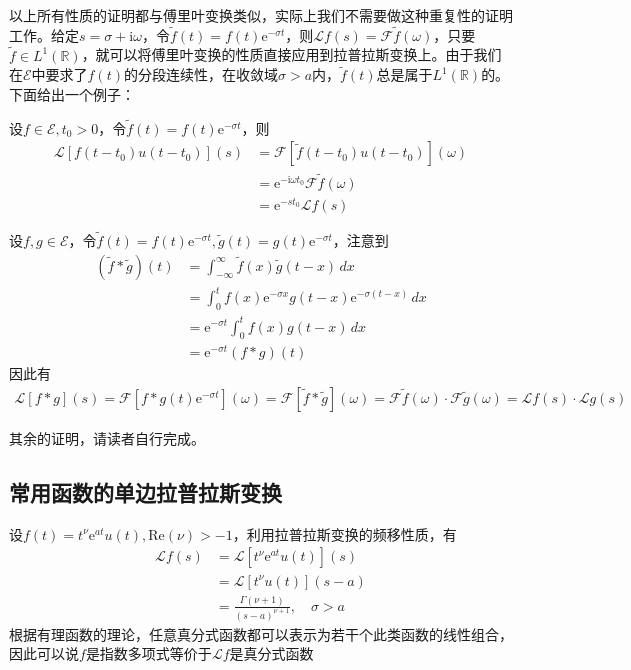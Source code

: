 以上所有性质的证明都与傅里叶变换类似，实际上我们不需要做这种重复性的证明工作。给定$s=\sigma+\mathrm{i}\omega$，令$\tilde{f}(t)=f(t)\mathrm{e}^{-\sigma t}$，则$\mathcal{L} f(s)=\mathcal{F} \tilde{f}(\omega)$，只要$\tilde{f}\in L^1(\mathbb{R} )$，就可以将傅里叶变换的性质直接应用到拉普拉斯变换上。由于我们在$\mathcal{E} $中要求了$f(t)$的分段连续性，在收敛域$\sigma>a$内，$\tilde{f}(t)$总是属于$L^1(\mathbb{R})$的。下面给出一个例子：
\begin{example}[时移性质]
    设$f\in\mathcal{E} ,t_0>0$，令$\tilde{f}(t)=f(t)\mathrm{e}^{-\sigma t}$，则
    \begin{align*}
        \mathcal{L}[f(t-t_0)u(t-t_0)](s)&=\mathcal{F} \left[\tilde{f}(t-t_0)u(t-t_0)\right](\omega)\\
        &=\mathrm{e}^{-\mathrm{i}\omega t_0}\mathcal{F} \tilde{f}(\omega)\\
        &=\mathrm{e}^{-s t_0}\mathcal{L} f(s)
    \end{align*}
\end{example}
\begin{example}[卷积定理]
设$f,g\in\mathcal{E} $，令$\tilde{f}(t)=f(t)\mathrm{e}^{-\sigma t}, \tilde{g}(t)=g(t)\mathrm{e}^{-\sigma t}$，注意到\begin{align*}
    (\tilde{f}*\tilde{g})(t)&=\int_{-\infty}^{\infty}\tilde{f}(x)\tilde{g}(t-x)\,dx\\
    &=\int_0^{t}f(x)\mathrm{e}^{-\sigma x}g(t-x)\mathrm{e}^{-\sigma (t-x)}\,dx\\
    &=\mathrm{e}^{-\sigma t}\int_0^{t}f(x)g(t-x)\,dx\\
    &=\mathrm{e}^{-\sigma t}(f*g)(t)
\end{align*}
因此有
    \begin{align*}
        \mathcal{L} \left[f*g\right](s)=\mathcal{F} \left[f*g(t)\mathrm{e}^{-\sigma t}\right](\omega)=\mathcal{F} \left[\tilde{f}*\tilde{g}\right](\omega)=\mathcal{F} \tilde{f}(\omega)\cdot \mathcal{F} \tilde{g}(\omega)=\mathcal{L} f(s)\cdot \mathcal{L} g(s)
    \end{align*}
\end{example}
其余的证明，请读者自行完成。

\subsection{常用函数的单边拉普拉斯变换}\label{sub:ordinary_laplace}

\begin{example}[指数多项式]
    设$f(t)=t^\nu \mathrm{e}^{a t}u(t),\mathrm{Re}(\nu)>-1$，利用拉普拉斯变换的频移性质，有
    \begin{align*}
        \mathcal{L} f(s)&=\mathcal{L}\left[t^\nu \mathrm{e}^{a t}u(t)\right](s)\\
        &=\mathcal{L} \left[t^\nu u(t)\right](s-a)\\
        &=\frac{\Gamma(\nu+1)}{(s-a)^{\nu+1}},\quad\sigma>a
    \end{align*}
    根据有理函数的理论，任意真分式函数都可以表示为若干个此类函数的线性组合，因此可以说$f$是指数多项式等价于$\mathcal{L} f$是真分式函数
\end{example}

